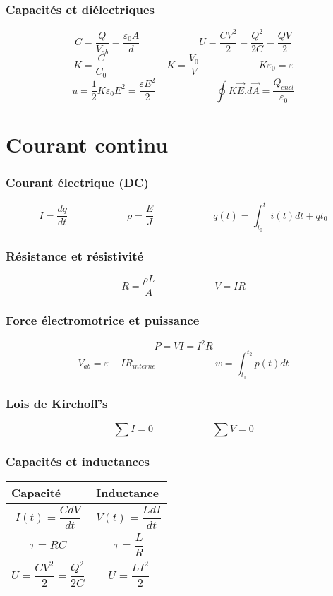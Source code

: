 \section{Capacités et diélectriques}
\[ C = \frac{Q}{V_{ab}} = \frac{\varepsilon_0A}{d}\qquad{\qquad{\qquad}} U = \frac{CV^2}{2} = \frac{Q^2}{2C} = \frac{QV}{2} \]
\[ K = \frac{C}{C_0}  \qquad{\qquad{\qquad}}   K = \frac{V_0}{V}  \qquad{\qquad{\qquad}}    K\varepsilon_0 = \varepsilon \]
\[ u = \frac{1}{2}K\varepsilon_0E^2 = \frac{\varepsilon{E^2}}{2} \qquad{\qquad{\qquad}} \oint{K}\vec{E}.d\vec{A} = \frac{Q_{encl}}{\varepsilon_0} \]

\part{Courant continu}
\section{Courant électrique (DC)}
\[I = \frac{dq}{dt}\qquad{\qquad{\qquad}}\rho = \frac{E}{J}\qquad{\qquad{\qquad}}q(t) = \int_{t_0}^{t}i(t) dt + q{t_0}\]

\section{Résistance et résistivité}
\[R = \frac{\rho{L}}{A} \qquad{\qquad{\qquad}}V = IR\]

\section{Force électromotrice et puissance}
\[P = VI = I^2R\] 
\[ V_{ab} = \varepsilon - IR_{interne}\qquad{\qquad{\qquad}}w = \int_{t_1}^{t_2}p(t) dt\]

\section{Lois de Kirchoff's}
\[\sum{I} = 0  \qquad{\qquad{\qquad}}\sum{V} = 0\]

\section{Capacités et inductances}

\begin{table}[H]
	\begin{center}
		\begin{tabular}{m{6.5cm}|m{6.5cm}}
			\textbf{Capacité} & \textbf{Inductance}\\
			\hline
			\[I(t) = \frac {CdV}{dt}\] & \[V(t) = \frac{LdI}{dt}\]\\
			\[\tau = RC\] & \[\tau = \frac{L}{R}\]\\
			\[U = \frac{CV^2}{2} = \frac{Q^2}{2C}\] & \[U = \frac{LI^2}{2}\]
		\end{tabular}
	\end{center}
\end{table}


